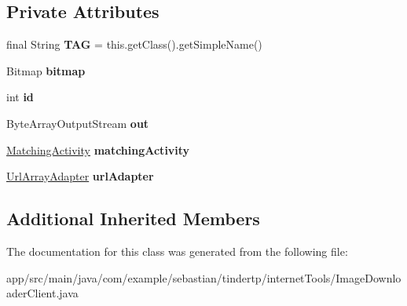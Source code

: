 \subsection*{Private Attributes}
\begin{DoxyCompactItemize}
\item 
final String {\bfseries T\+AG} = this.\+get\+Class().get\+Simple\+Name()\hypertarget{classcom_1_1example_1_1sebastian_1_1tindertp_1_1internetTools_1_1ImageDownloaderClient_a3ad20d251f27c5cbff0e6a265bb33c3d}{}\label{classcom_1_1example_1_1sebastian_1_1tindertp_1_1internetTools_1_1ImageDownloaderClient_a3ad20d251f27c5cbff0e6a265bb33c3d}

\item 
Bitmap {\bfseries bitmap}\hypertarget{classcom_1_1example_1_1sebastian_1_1tindertp_1_1internetTools_1_1ImageDownloaderClient_abdc692acce097a8e420cfe03abcf9b29}{}\label{classcom_1_1example_1_1sebastian_1_1tindertp_1_1internetTools_1_1ImageDownloaderClient_abdc692acce097a8e420cfe03abcf9b29}

\item 
int {\bfseries id}\hypertarget{classcom_1_1example_1_1sebastian_1_1tindertp_1_1internetTools_1_1ImageDownloaderClient_a745271f2b1db37a2e4a8fd7389fc560a}{}\label{classcom_1_1example_1_1sebastian_1_1tindertp_1_1internetTools_1_1ImageDownloaderClient_a745271f2b1db37a2e4a8fd7389fc560a}

\item 
Byte\+Array\+Output\+Stream {\bfseries out}\hypertarget{classcom_1_1example_1_1sebastian_1_1tindertp_1_1internetTools_1_1ImageDownloaderClient_a2d3db4d2c1e34049fbc7cda084b7a93f}{}\label{classcom_1_1example_1_1sebastian_1_1tindertp_1_1internetTools_1_1ImageDownloaderClient_a2d3db4d2c1e34049fbc7cda084b7a93f}

\item 
\hyperlink{classcom_1_1example_1_1sebastian_1_1tindertp_1_1MatchingActivity}{Matching\+Activity} {\bfseries matching\+Activity}\hypertarget{classcom_1_1example_1_1sebastian_1_1tindertp_1_1internetTools_1_1ImageDownloaderClient_a235cf562031777333f480b7b159e2a13}{}\label{classcom_1_1example_1_1sebastian_1_1tindertp_1_1internetTools_1_1ImageDownloaderClient_a235cf562031777333f480b7b159e2a13}

\item 
\hyperlink{classcom_1_1example_1_1sebastian_1_1tindertp_1_1internetTools_1_1UrlArrayAdapter}{Url\+Array\+Adapter} {\bfseries url\+Adapter}\hypertarget{classcom_1_1example_1_1sebastian_1_1tindertp_1_1internetTools_1_1ImageDownloaderClient_a2eacac791b5335fbf7c3f8a9fff168f0}{}\label{classcom_1_1example_1_1sebastian_1_1tindertp_1_1internetTools_1_1ImageDownloaderClient_a2eacac791b5335fbf7c3f8a9fff168f0}

\end{DoxyCompactItemize}
\subsection*{Additional Inherited Members}


The documentation for this class was generated from the following file\+:\begin{DoxyCompactItemize}
\item 
app/src/main/java/com/example/sebastian/tindertp/internet\+Tools/Image\+Downloader\+Client.\+java\end{DoxyCompactItemize}

